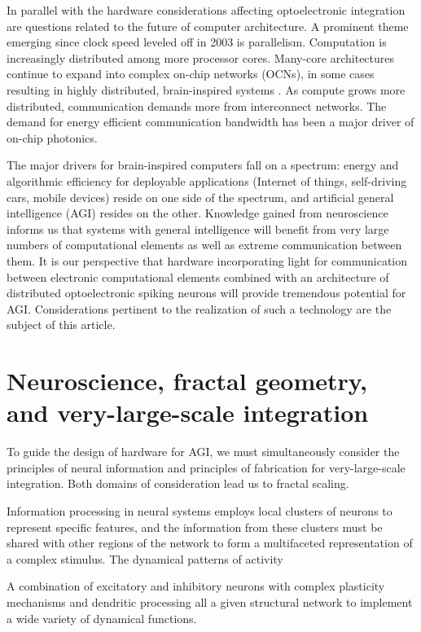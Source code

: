 \documentclass[twocolumn]{article}
\begin{document}
In parallel with the hardware considerations affecting optoelectronic integration are questions related to the future of computer architecture. A prominent theme emerging since clock speed leveled off in 2003 \cite{} is parallelism. Computation is increasingly distributed among more processor cores. Many-core architectures continue to expand into complex on-chip networks (OCNs), in some cases resulting in highly distributed, brain-inspired systems \cite{}. As compute grows more distributed, communication demands more from interconnect networks. The demand for energy efficient communication bandwidth has been a major driver of on-chip photonics.

The major drivers for brain-inspired computers fall on a spectrum: energy and algorithmic efficiency for deployable applications (Internet of things, self-driving cars, mobile devices) reside on one side of the spectrum, and artificial general intelligence (AGI) resides on the other. Knowledge gained from neuroscience informs us that systems with general intelligence will benefit from very large numbers of computational elements as well as extreme communication between them. It is our perspective that hardware incorporating light for communication between electronic computational elements combined with an architecture of distributed optoelectronic spiking neurons will provide tremendous potential for AGI. Considerations pertinent to the realization of such a technology are the subject of this article.

\section{\label{sec:neuroFractalsAndVLSI}Neuroscience, fractal geometry, and very-large-scale integration}
To guide the design of hardware for AGI, we must simultaneously consider the principles of neural information and principles of fabrication for very-large-scale integration. Both domains of consideration lead us to fractal scaling.

Information processing in neural systems employs local clusters of neurons to represent specific features, and the information from these clusters must be shared with other regions of the network to form a multifaceted representation of a complex stimulus. The dynamical patterns of activity

A combination of excitatory and inhibitory neurons with complex plasticity mechanisms and dendritic processing all a given structural network to implement a wide variety of dynamical functions. 
\end{document}
